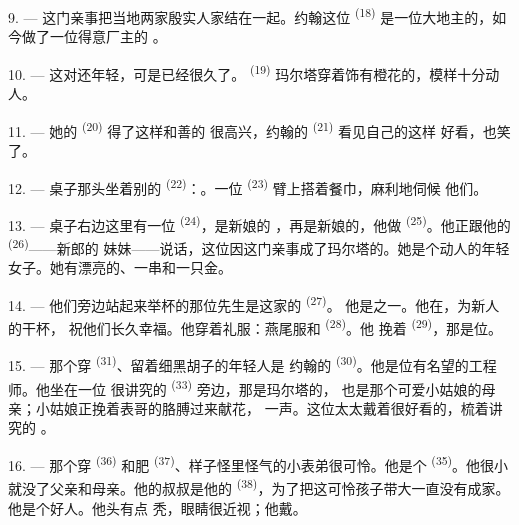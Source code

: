 9. --- 这门亲事把当地两家殷实人家结在一起。约翰这位
\textsuperscript{(18)} 是一位大地主的，如今做了一位得意厂主的
。

10. --- 这对还年轻，可是已经很久了。
\textsuperscript{(19)} 玛尔塔穿着饰有橙花的，模样十分动人。

11. --- 她的 \textsuperscript{(20)} 得了这样和善的
很高兴，约翰的 \textsuperscript{(21)} 看见自己的这样
好看，也笑了。

12. --- 桌子那头坐着别的 \textsuperscript{(22)}：。一位 \textsuperscript{(23)} 臂上搭着餐巾，麻利地伺候
他们。

\VUsaut{3.0mm}

13. --- 桌子右边这里有一位 \textsuperscript{(24)}，是新娘的
，再是新娘的，他做
\textsuperscript{(25)}。他正跟他的 \textsuperscript{(26)}——新郎的
妹妹——说话，这位因这门亲事成了玛尔塔的。她是个动人的年轻
女子。她有漂亮的、一串和一只金。

14. --- 他们旁边站起来举杯的那位先生是这家的 \textsuperscript{(27)}。
他是之一。他在，为新人的干杯，
祝他们长久幸福。他穿着礼服：燕尾服和 \textsuperscript{(28)}。他
挽着 \textsuperscript{(29)}，那是位。

15. --- 那个穿 \textsuperscript{(31)}、留着细黑胡子的年轻人是
约翰的 \textsuperscript{(30)}。他是位有名望的工程师。他坐在一位
很讲究的 \textsuperscript{(33)} 旁边，那是玛尔塔的，
也是那个可爱小姑娘的母亲；小姑娘正挽着表哥的胳膊过来献花，
一声。这位太太戴着很好看的，梳着讲究的
。

16. --- 那个穿 \textsuperscript{(36)} 和肥
\textsuperscript{(37)}、样子怪里怪气的小表弟很可怜。他是个
\textsuperscript{(35)}。他很小就没了父亲和母亲。他的叔叔是他的
\textsuperscript{(38)}，为了把这可怜孩子带大一直没有成家。他是个好人。他头有点
秃，眼睛很近视；他戴。

\VUsaut{2.4mm}
\VUsaut{3.0mm}

